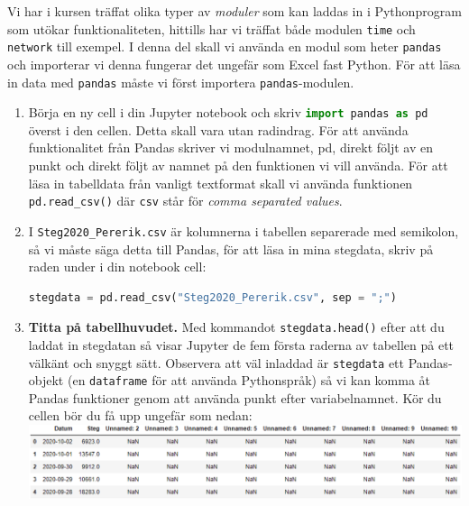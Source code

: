 \documentclass{article}
\begin{document}
Vi har i kursen träffat olika typer av \emph{moduler} som kan laddas in i Pythonprogram som utökar funktionaliteten, hittills har vi träffat både modulen \verb+time+ och \verb+network+ till exempel. I denna del skall vi använda en modul som heter \verb+pandas+ och importerar vi denna fungerar det ungefär som Excel fast Python. För att läsa in data med \verb+pandas+ måste vi först importera \verb+pandas+-modulen. 
\begin{enumerate}
    \item Börja en ny cell i din Jupyter notebook och skriv \lstinline[language=Python]{import pandas as pd} överst i den cellen. Detta skall vara utan radindrag. För att använda funktionalitet från Pandas skriver vi modulnamnet, pd, direkt följt av en punkt och direkt följt av namnet på den funktionen vi vill använda. För att läsa in tabelldata från vanligt textformat skall vi använda funktionen \lstinline[language=Python]{pd.read_csv()} där \verb+csv+ står för \emph{comma separated values}. 
    \item I \verb+Steg2020_Pererik.csv+ är kolumnerna i tabellen separerade med semikolon, så vi måste säga detta till Pandas, för att läsa in mina stegdata, skriv på raden under i din notebook cell:
  \begin{lstlisting}[language=Python]
    stegdata = pd.read_csv("Steg2020_Pererik.csv", sep = ";")
    \end{lstlisting}
\item \textbf{Titta på tabellhuvudet.} Med kommandot \lstinline[language=Python]{stegdata.head()} efter att du laddat in stegdatan så visar Jupyter de fem första raderna av tabellen på ett välkänt och snyggt sätt. Observera att väl inladdad är \verb+stegdata+ ett Pandas-objekt (en \verb+dataframe+ för att använda Pythonspråk) så vi kan komma åt Pandas funktioner genom att använda punkt efter variabelnamnet. Kör du cellen bör du få upp ungefär som nedan:\\
  \includegraphics[width=\textwidth]{figures/anaconda8.png}\\

\end{enumerate}
\end{document}
